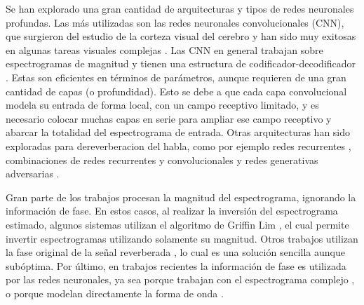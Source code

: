 Se han explorado una gran cantidad de arquitecturas y tipos de redes neuronales profundas. Las más utilizadas son las redes neuronales convolucionales (CNN), que surgieron del estudio de la corteza visual del cerebro y han sido muy exitosas en algunas tareas visuales complejas \cite{lagartija}.  Las CNN en general trabajan sobre espectrogramas de magnitud y tienen una estructura de codificador-decodificador \cite{FCN, rir_filtinverso}. Estas son eficientes en términos de parámetros, aunque requieren de una gran cantidad de capas (o profundidad). Esto se debe a que cada capa convolucional modela su entrada de forma local, con un campo receptivo limitado, y es necesario colocar muchas capas en serie para ampliar ese campo receptivo y abarcar la totalidad del espectrograma de entrada. Otras arquitecturas han sido exploradas para dereverberacion del habla, como por ejemplo redes recurrentes \cite{RNN}, combinaciones de redes recurrentes y convolucionales \cite{RNN+CNN} y redes generativas adversarias \cite{GAN}.


Gran parte de los trabajos procesan la magnitud del espectrograma, ignorando la información de fase. En estos casos, al realizar la inversión del espectrograma estimado, algunos sistemas \cite{ezeKun} utilizan el algoritmo de Griffin Lim \cite{griffinlim}, el cual permite invertir espectrogramas utilizando solamente su magnitud. Otros trabajos utilizan la fase original de la señal reverberada \cite{CNN, FCN, skip, rir_filtinverso}, lo cual es una solución sencilla aunque subóptima. Por último, en trabajos recientes la información de fase es utilizada por las redes neuronales, ya sea porque trabajan con el espectrograma complejo \cite{cIRM}, o porque modelan directamente la forma de onda \cite{hifiGAN}.